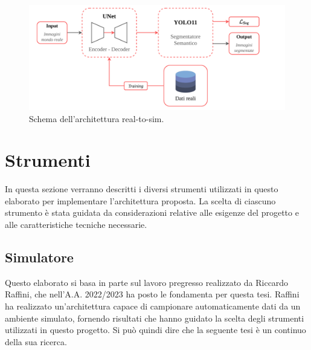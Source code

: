 \documentclass[12pt]{report}
\begin{document}
\begin{figure}[t]
	\centering
	\includegraphics[width=\textwidth, clip]{images/unet-yolo-architecture}
	\caption{Schema dell'architettura real-to-sim.}
	\label{fig:architettura-unet-yolo}
\end{figure}

\section{Strumenti}
\label{sec:strumenti}

In questa sezione verranno descritti i diversi strumenti utilizzati in questo elaborato per implementare l'architettura proposta. La scelta di ciascuno strumento è stata guidata da considerazioni relative alle esigenze del progetto e alle caratteristiche tecniche necessarie.

\subsection{Simulatore}
\label{sec:simulatore}

Questo elaborato si basa in parte sul lavoro pregresso realizzato da Riccardo Raffini, che nell'A.A. 2022/2023 ha posto le fondamenta per questa tesi. Raffini ha realizzato un'architettura capace di campionare automaticamente dati da un ambiente simulato, fornendo risultati che hanno guidato la scelta degli strumenti utilizzati in questo progetto. Si può quindi dire che la seguente tesi è un continuo della sua ricerca.
\end{document}
